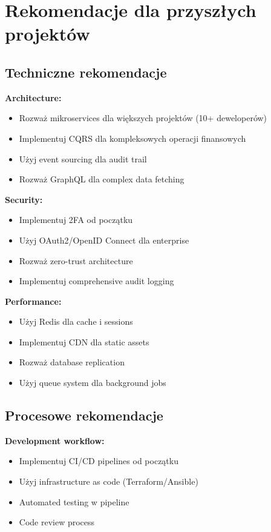\documentclass[12pt,a4paper]{article}
\begin{document}
    \section{Rekomendacje dla przyszłych projektów}

    \subsection{Techniczne rekomendacje}

    \textbf{Architecture:}
    \begin{itemize}
        \item Rozważ mikroservices dla większych projektów (10+ deweloperów)
        \item Implementuj CQRS dla kompleksowych operacji finansowych
        \item Użyj event sourcing dla audit trail
        \item Rozważ GraphQL dla complex data fetching
    \end{itemize}

    \textbf{Security:}
    \begin{itemize}
        \item Implementuj 2FA od początku
        \item Użyj OAuth2/OpenID Connect dla enterprise
        \item Rozważ zero-trust architecture
        \item Implementuj comprehensive audit logging
    \end{itemize}

    \textbf{Performance:}
    \begin{itemize}
        \item Użyj Redis dla cache i sessions
        \item Implementuj CDN dla static assets
        \item Rozważ database replication
        \item Użyj queue system dla background jobs
    \end{itemize}

    \subsection{Procesowe rekomendacje}

    \textbf{Development workflow:}
    \begin{itemize}
        \item Implementuj CI/CD pipelines od początku
        \item Użyj infrastructure as code (Terraform/Ansible)
        \item Automated testing w pipeline
        \item Code review process
    \end{itemize}
\end{document}

